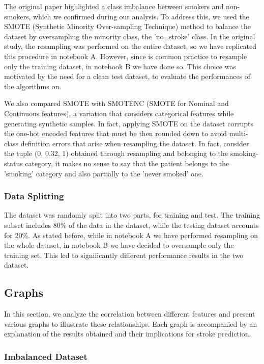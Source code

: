 \documentclass{Configuration_Files/Template}
\begin{document}
The original paper highlighted a class imbalance between smokers and non-smokers, which we confirmed during our analysis. To address this, we used the SMOTE (Synthetic Minority Over-sampling Technique) method to balance the dataset by oversampling the minority class, the 'no\_stroke' class. In the original study, the resampling was performed on the entire dataset, so we have replicated this procedure in notebook A. However, since is common practice to resample only the training dataset, in notebook B we have done so. This choice was motivated by the need for a clean test dataset, to evaluate the performances of the algorithms on.

We also compared SMOTE with SMOTENC (SMOTE for Nominal and Continuous features), a variation that considers categorical features while generating synthetic samples. In fact, applying SMOTE on the dataset corrupts the one-hot encoded features that must be then rounded down to avoid multi-class definition errors that arise when resampling the dataset. In fact, consider the tuple (0, 0.32, 1) obtained through resampling and belonging to the smoking-status category, it makes no sense to say that the patient belongs to the 'smoking' category and also partially to the 'never smoked' one.

\subsubsection{Data Splitting}

The dataset was randomly split into two parts, for training and test. The training subset includes 80\% of the data in the dataset, while the testing dataset accounts for 20\%. As stated before, while in notebook A we have performed resampling on the whole dataset, in notebook B we have decided to oversample only the training set. This led to significantly different performance results in the two dataset.

\subsection{Graphs}

In this section, we analyze the correlation between different features and present various graphs to illustrate these relationships. Each graph is accompanied by an explanation of the results obtained and their implications for stroke prediction.

\subsubsection{Imbalanced Dataset}
\end{document}
